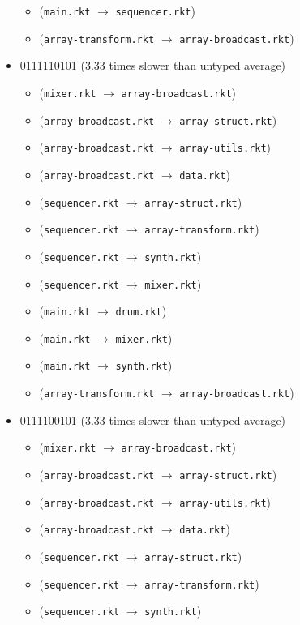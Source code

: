 \documentclass{article}
\newcommand{\mono}[1]{\texttt{#1}}
\begin{document}
\begin{itemize}
\begin{itemize}
  \item (\mono{main.rkt} $\rightarrow$ \mono{sequencer.rkt})
  \item (\mono{array-transform.rkt} $\rightarrow$ \mono{array-broadcast.rkt})
  \end{itemize}
\item 0111110101 (3.33 times slower than untyped average)
  \begin{itemize}
  \item (\mono{mixer.rkt} $\rightarrow$ \mono{array-broadcast.rkt})
  \item (\mono{array-broadcast.rkt} $\rightarrow$ \mono{array-struct.rkt})
  \item (\mono{array-broadcast.rkt} $\rightarrow$ \mono{array-utils.rkt})
  \item (\mono{array-broadcast.rkt} $\rightarrow$ \mono{data.rkt})
  \item (\mono{sequencer.rkt} $\rightarrow$ \mono{array-struct.rkt})
  \item (\mono{sequencer.rkt} $\rightarrow$ \mono{array-transform.rkt})
  \item (\mono{sequencer.rkt} $\rightarrow$ \mono{synth.rkt})
  \item (\mono{sequencer.rkt} $\rightarrow$ \mono{mixer.rkt})
  \item (\mono{main.rkt} $\rightarrow$ \mono{drum.rkt})
  \item (\mono{main.rkt} $\rightarrow$ \mono{mixer.rkt})
  \item (\mono{main.rkt} $\rightarrow$ \mono{synth.rkt})
  \item (\mono{array-transform.rkt} $\rightarrow$ \mono{array-broadcast.rkt})
  \end{itemize}
\item 0111100101 (3.33 times slower than untyped average)
  \begin{itemize}
  \item (\mono{mixer.rkt} $\rightarrow$ \mono{array-broadcast.rkt})
  \item (\mono{array-broadcast.rkt} $\rightarrow$ \mono{array-struct.rkt})
  \item (\mono{array-broadcast.rkt} $\rightarrow$ \mono{array-utils.rkt})
  \item (\mono{array-broadcast.rkt} $\rightarrow$ \mono{data.rkt})
  \item (\mono{sequencer.rkt} $\rightarrow$ \mono{array-struct.rkt})
  \item (\mono{sequencer.rkt} $\rightarrow$ \mono{array-transform.rkt})
  \item (\mono{sequencer.rkt} $\rightarrow$ \mono{synth.rkt})

\end{itemize}
\end{itemize}
\end{document}

